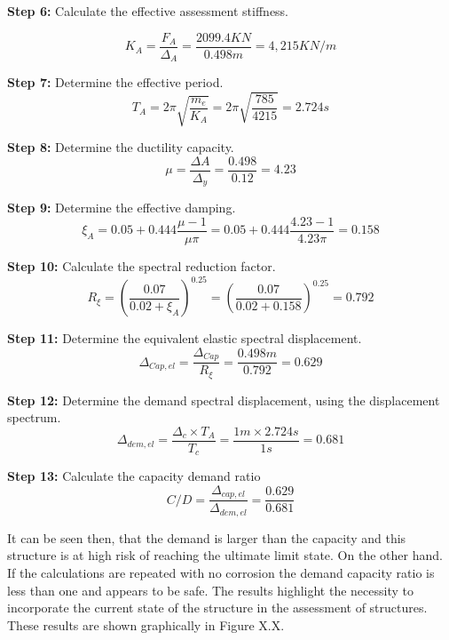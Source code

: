 \textbf{Step 6:} Calculate the effective assessment stiffness.

\begin{displaymath}
    K_{A}=\frac{F_{A}}{\Delta_{A}}=\frac{2099.4 KN}{0.498 m}=4,215 KN/m
\end{displaymath}

\textbf{Step 7:} Determine the effective period.
\begin{displaymath}
    T_{A}=2\pi \sqrt{\frac{m_e}{K_A}}=2\pi \sqrt{\frac{785}{4215}}=2.724 s
\end{displaymath}

\textbf{Step 8:} Determine the ductility capacity.
\begin{displaymath}
    \mu = \frac{\Delta{A}}{\Delta_{y}} = \frac{0.498}{0.12} = 4.23
\end{displaymath}

\textbf{Step 9:} Determine the effective damping.
\begin{displaymath}
    \xi_{A}=0.05+0.444\frac{\mu-1}{\mu\pi}=0.05+0.444\frac{4.23-1}{4.23\pi}=0.158
\end{displaymath}

\textbf{Step 10:} Calculate the spectral reduction factor.
\begin{displaymath}
     R_{\xi}=\left(\frac{0.07}{0.02+\xi_{A}}\right)^{0.25}=\left(\frac{0.07}{0.02+0.158}\right)^{0.25}=0.792
\end{displaymath}

\textbf{Step 11:} Determine the equivalent elastic spectral displacement.
\begin{displaymath}
     \Delta_{Cap,el}=\frac{\Delta_{Cap}}{R_{\xi}}=\frac{0.498m}{0.792}=0.629
\end{displaymath}

\textbf{Step 12:} Determine the demand spectral displacement, using the displacement spectrum.
\begin{displaymath}
     \Delta_{dem,el}=\frac{\Delta_{c} \times T_{A}}{T_{c}}=\frac{1m \times 2.724s}{1s}=0.681
\end{displaymath}

\textbf{Step 13:} Calculate the capacity demand ratio
\begin{displaymath}
     C/D= \frac{\Delta_{cap,el}}{\Delta_{dem,el}}= \frac{0.629}{0.681}
\end{displaymath}

It can be seen then, that the demand is larger than the capacity and this structure is at high risk of reaching the ultimate limit state. On the other hand. If the calculations are repeated with no corrosion the demand capacity ratio is less than one and appears to be safe. The results highlight the necessity to incorporate the current state of the structure in the assessment of structures. These results are shown graphically in Figure X.X.

